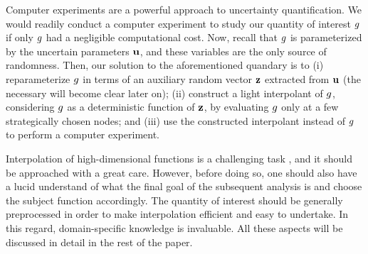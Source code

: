 Computer experiments \cite{santner2003} are a powerful approach to uncertainty
quantification. We would readily conduct a computer experiment to study our
quantity of interest $g$ if only $g$ had a negligible computational cost. Now,
recall that $g$ is parameterized by the uncertain parameters $\mathbf{u}$, and these
variables are the only source of randomness. Then, our solution to the
aforementioned quandary is to (i) reparameterize $g$ in terms of an auxiliary
random vector $\mathbf{z}$ extracted from $\mathbf{u}$ (the necessary will become clear later
on); (ii) construct a light interpolant of $g$, considering $g$ as a
deterministic function of $\mathbf{z}$, by evaluating $g$ only at a few strategically
chosen nodes; and (iii) use the constructed interpolant instead of $g$ to
perform a computer experiment.

Interpolation of high-dimensional functions is a challenging task \perse, and it
should be approached with a great care. However, before doing so, one should
also have a lucid understand of what the final goal of the subsequent analysis
is and choose the subject function accordingly. The quantity of interest should
be generally preprocessed in order to make interpolation efficient and easy to
undertake. In this regard, domain-specific knowledge is invaluable. All these
aspects will be discussed in detail in the rest of the paper.
